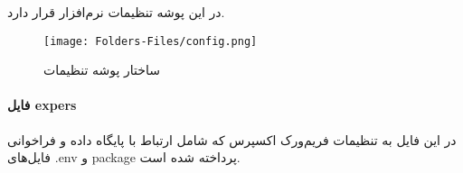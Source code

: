 در این پوشه تنظیمات نرم‌افزار قرار دارد. 

\begin{figure}[H]
	\texttt{[image: Folders-Files/config.png]}
	\centering
	\caption{ساختار پوشه تنظیمات}
	\label{fig:folder-config}
\end{figure}

\paragraph{فایل expers}
در این فایل به تنظیمات فریم‌ورک اکسپرس که شامل ارتباط با پایگاه داده و فراخوانی فایل‌های .env و package پرداخته شده است. 
